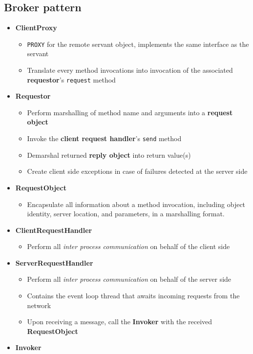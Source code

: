 \documentclass[11pt]{article}
\providecommand{\tightlist}{%
      \setlength{\itemsep}{0pt}\setlength{\parskip}{0pt}}
\begin{document}
    \hypertarget{broker-pattern}{%
\subsection{Broker pattern}\label{broker-pattern}}

\begin{itemize}
\tightlist
\item
  \textbf{ClientProxy}

  \begin{itemize}
  \tightlist
  \item
    \texttt{PROXY} for the remote servant object, implements the same
    interface as the servant
  \item
    Translate every method invocations into invocation of the associated
    \textbf{requestor}'s \texttt{request} method
  \end{itemize}
\item
  \textbf{Requestor}

  \begin{itemize}
  \tightlist
  \item
    Perform marshalling of method name and arguments into a
    \textbf{request object}
  \item
    Invoke the \textbf{client request handler}'s \texttt{send} method
  \item
    Demarshal returned \textbf{reply object} into return value(s)
  \item
    Create client side exceptions in case of failures detected at the
    server side
  \end{itemize}
\item
  \textbf{RequestObject}

  \begin{itemize}
  \tightlist
  \item
    Encapsulate all information about a method invocation, including
    object identity, server location, and parameters, in a marshalling
    format.
  \end{itemize}
\item
  \textbf{ClientRequestHandler}

  \begin{itemize}
  \tightlist
  \item
    Perform all \emph{inter process communication} on behalf of the
    client side
  \end{itemize}
\item
  \textbf{ServerRequestHandler}

  \begin{itemize}
  \tightlist
  \item
    Perform all \emph{inter process communication} on behalf of the
    server side
  \item
    Contains the event loop thread that awaits incoming requests from
    the network
  \item
    Upon receiving a message, call the \textbf{Invoker} with the
    received \textbf{RequestObject}
  \end{itemize}
\item
  \textbf{Invoker}


\end{itemize}
\end{document}
